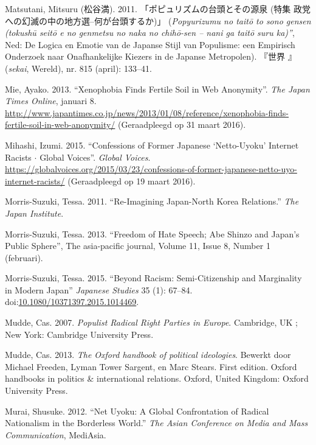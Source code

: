 \documentclass[10.5pt,dutch,]{article}
\begin{document}
\hypertarget{ref-matsutaniux5fpopyurizumuux5f2011}{}
Matsutani, Mitsuru (松谷満). 2011. 「ポピュリズムの台頭とその源泉 (特集 政党への幻滅の中の地方選--何が台頭するか)」 (\emph{Popyurizumu no taitō to sono gensen (tokushū seitō e no genmetsu no naka no chihō-sen -- nani ga taitō suru ka)”}, Ned: De Logica en Emotie van de Japanse Stijl van Populisme: een Empirisch Onderzoek naar Onafhankelijke Kiezers in de Japanse Metropolen).   『世界 』(\emph{sekai}, Wereld), nr. 815 (april): 133–41.

\hypertarget{ref-mieux5fxenophobiaux5f2013}{}
Mie, Ayako. 2013. “Xenophobia Finds Fertile Soil in Web Anonymity”. \emph{The Japan Times Online}, januari 8. \url{http://www.japantimes.co.jp/news/2013/01/08/reference/xenophobia-finds-fertile-soil-in-web-anonymity/} (Geraadpleegd op 31 maart 2016).

\hypertarget{ref-izumiux5fmihashiux5fconfessionsux5f2015}{}
Mihashi, Izumi. 2015. “Confessions of Former Japanese ‘Netto-Uyoku’ Internet Racists \(\cdot\) Global Voices”. \emph{Global Voices}. \url{https://globalvoices.org/2015/03/23/confessions-of-former-japanese-netto-uyo-internet-racists/} (Geraadpleegd op 19 maart 2016).

\hypertarget{ref-morris-suzukiux5fre-imaginingux5f2011}{}
Morris-Suzuki, Tessa. 2011. “Re-Imagining Japan-North Korea Relations.”
\emph{The Japan Institute}.

\hypertarget{ref-morris-suzukiux5ffreedomux5f2013}{}
Morris-Suzuki, Tessa. 2013. “Freedom of Hate Speech; Abe Shinzo and Japan’s Public Sphere”, The asia-pacific journal, Volume 11, Issue 8, Number 1
(februari).

\hypertarget{ref-morris-suzukiux5fbeyondux5f2015}{}
Morris-Suzuki, Tessa. 2015.  “Beyond Racism: Semi-Citizenship and Marginality in Modern Japan” \emph{Japanese Studies} 35 (1): 67--84.
doi:\href{https://doi.org/10.1080/10371397.2015.1014469}{10.1080/10371397.2015.1014469}.

\hypertarget{ref-muddeux5fpopulistux5f2007}{}
Mudde, Cas. 2007. \emph{Populist Radical Right Parties in Europe}.
Cambridge, UK ; New York: Cambridge University Press.

\hypertarget{ref-muddeux5foxfordux5f2013}{}
Mudde, Cas. 2013. \emph{The Oxford handbook of political ideologies}.
Bewerkt door Michael Freeden, Lyman Tower Sargent, en Marc Stears. First
edition. Oxford handbooks in politics \& international relations.
Oxford, United Kingdom: Oxford University Press.

\hypertarget{ref-muraiux5fnetux5f2012}{}
Murai, Shusuke. 2012. “Net Uyoku: A Global Confrontation of Radical
Nationalism in the Borderless World.” \emph{The Asian Conference on Media
and Mass Communication}, MediAsia.
\end{document}
